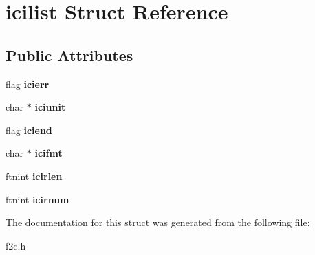 \hypertarget{structicilist}{
\section{icilist Struct Reference}
\label{structicilist}
}
\subsection*{Public Attributes}
\begin{DoxyCompactItemize}
\item 
\hypertarget{structicilist_aee2f6c57bb6df08adfc9d62a185f999a}{
flag {\bfseries icierr}}
\label{structicilist_aee2f6c57bb6df08adfc9d62a185f999a}

\item 
\hypertarget{structicilist_a4da4c2525fa8e39989ddc28f99b86b13}{
char $\ast$ {\bfseries iciunit}}
\label{structicilist_a4da4c2525fa8e39989ddc28f99b86b13}

\item 
\hypertarget{structicilist_a598f4d4f880c560238c7a32f5dcb3e51}{
flag {\bfseries iciend}}
\label{structicilist_a598f4d4f880c560238c7a32f5dcb3e51}

\item 
\hypertarget{structicilist_a3689b68768a386cbcc460eb2632118e9}{
char $\ast$ {\bfseries icifmt}}
\label{structicilist_a3689b68768a386cbcc460eb2632118e9}

\item 
\hypertarget{structicilist_ac6025ddf8b1ade5cb73d607dd2d30501}{
ftnint {\bfseries icirlen}}
\label{structicilist_ac6025ddf8b1ade5cb73d607dd2d30501}

\item 
\hypertarget{structicilist_a6e4cb8719f1c76ee87273671448da892}{
ftnint {\bfseries icirnum}}
\label{structicilist_a6e4cb8719f1c76ee87273671448da892}

\end{DoxyCompactItemize}


The documentation for this struct was generated from the following file:\begin{DoxyCompactItemize}
\item 
f2c.h\end{DoxyCompactItemize}
